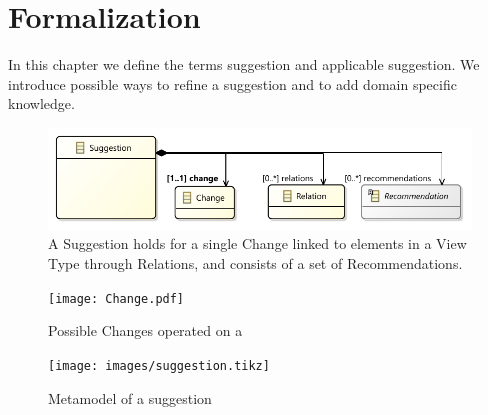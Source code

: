 \section{Formalization}
\label{sec:Formalization}
In this chapter we define the terms suggestion and applicable suggestion. We introduce possible ways to refine a suggestion and to add domain specific knowledge.

\begin{figure}
    \centering
    \includegraphics[width=\columnwidth]{images/Suggestion.pdf}
    \caption{A \textsf{Suggestion} holds for a single \textsf{Change} linked to elements in a View Type through \textsf{Relation}s, and consists of a set of \textsf{Recommendation}s.}
    \label{fig:Suggestion}
\end{figure}

\begin{figure}
    \centering
    \texttt{[image: Change.pdf]}
    \caption{Possible \textsf{Change}s operated on a \metamodel {}}
    \label{fig:Change}
\end{figure}


\begin{figure}
    \texttt{[image: images/suggestion.tikz]}
    \caption{Metamodel of a suggestion}
    \label{fig:suggestionmm}
\end{figure}


